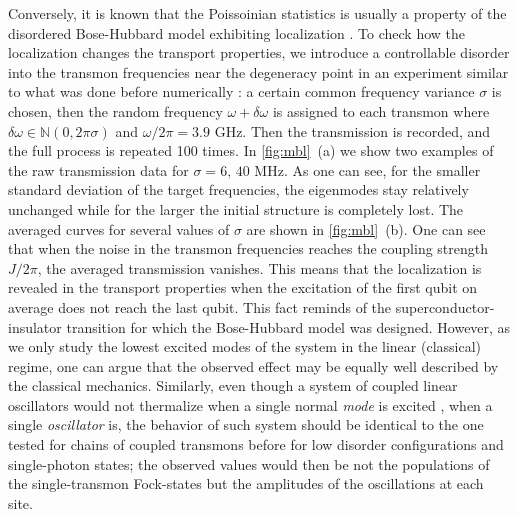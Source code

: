 \documentclass[%
 aps, pra,
 amsmath,amssymb,
 reprint,%
superscriptaddress
]{revtex4-2}
\begin{document}
Conversely, it is known that the Poissoinian statistics is usually a property of the disordered Bose-Hubbard model exhibiting localization \cite{roushan2017spectroscopic, Yan2019,Ye2019}. To check how the localization changes the transport properties, we introduce a controllable disorder into the transmon frequencies near the degeneracy point in an experiment similar to what was done before numerically \cite{orell2019probing}: a certain common frequency variance $\sigma$ is chosen, then the random frequency $\omega + \delta \omega$ is assigned to each transmon where $\delta\omega \in \mathbb N(0,2\pi\sigma)$ and $\omega/2\pi = 3.9$ GHz. Then the transmission is recorded, and the full process is repeated 100 times. 
In \autoref{fig:mbl}~(a) we show two examples of the raw transmission data for  $\sigma = 6,\, 40$ MHz. As one can see, for the smaller standard deviation of the target frequencies, the eigenmodes stay relatively unchanged while for the larger the initial structure is completely lost. The averaged curves for several values of $\sigma$ are shown in \autoref{fig:mbl}~(b). One can see that when the noise in the transmon frequencies reaches the coupling strength $J/2\pi$, the averaged transmission vanishes. This means that the localization is revealed in the transport properties when the excitation of the first qubit on average does not reach the last qubit. This fact reminds of the superconductor-insulator transition \cite{bruder1993superconductor} for which the Bose-Hubbard model was designed. However, as we only study the lowest excited modes of the system in the linear (classical) regime, one can argue that the observed effect may be equally well described by the classical mechanics. Similarly, even though a system of coupled linear oscillators would not thermalize when a single normal \textit{mode} is excited \cite{deutsch2018eigenstate}, when a single \textit{oscillator} is, the behavior of such system should be identical to the one tested for chains of coupled transmons before \cite{Yan2019, ma2019dissipatively} for low disorder configurations and single-photon states; the observed values would then be not the populations of the single-transmon Fock-states but the amplitudes of the oscillations at each site.
\end{document}

